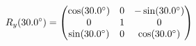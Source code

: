 \documentclass[preview]{standalone}
\begin{document}
\begin{align*}
\special{dvisvgm:raw <g id='unique000'>}R_y(30.0^\circ) = \begin{pmatrix} \cos(30.0^\circ) & 0 & -\sin(30.0^\circ) \\ 0 & 1 & 0 \\ \sin(30.0^\circ) & 0 & \cos(30.0^\circ) \end{pmatrix}\special{dvisvgm:raw </g>}
\end{align*}
\end{document}
